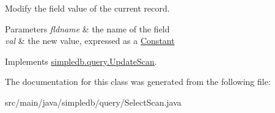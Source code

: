 Modify the field value of the current record. 
\begin{DoxyParams}{Parameters}
{\em fldname} & the name of the field \\
\hline
{\em val} & the new value, expressed as a \hyperlink{classsimpledb_1_1query_1_1Constant}{Constant} \\
\hline
\end{DoxyParams}


Implements \hyperlink{interfacesimpledb_1_1query_1_1UpdateScan_a70fdd638a395be56dcbc65ecd791f075}{simpledb.\+query.\+Update\+Scan}.



The documentation for this class was generated from the following file\+:\begin{DoxyCompactItemize}
\item 
src/main/java/simpledb/query/Select\+Scan.\+java\end{DoxyCompactItemize}
